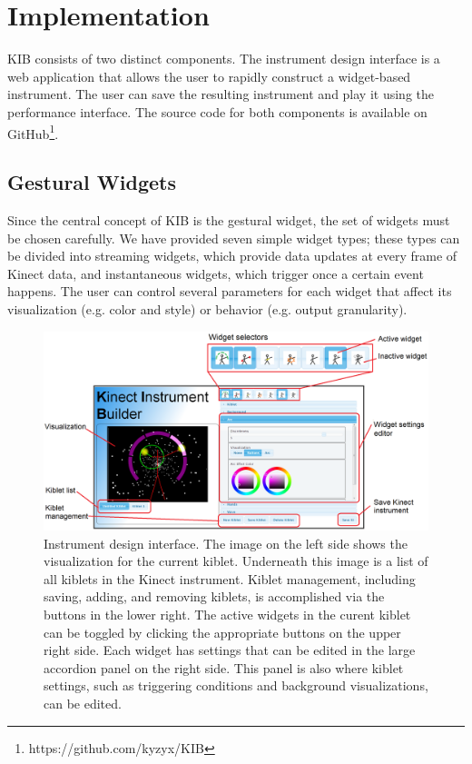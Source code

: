 \documentclass{nime-alternate}
\begin{document}
\section{Implementation}
KIB consists of two distinct components. The instrument design interface is a web
application that allows the user to rapidly construct a widget-based instrument. The user
can save the resulting instrument and play it using the performance interface. The source code
for both components is available on GitHub\footnote{https://github.com/kyzyx/KIB}.
\subsection{Gestural Widgets}
Since the central concept of KIB is the gestural widget, the set of widgets must be chosen
carefully. We have provided seven simple widget types; these types can be divided into streaming
widgets, which provide data updates at every frame of Kinect data, and instantaneous widgets,
which trigger once a certain event happens. The user can control several parameters for each widget
that affect its visualization (e.g. color and style) or behavior (e.g. output granularity).
\begin{figure}
	\centering
		\includegraphics[width=1\textwidth]{figures/kib.png}
	\caption{Instrument design interface. The image on the left side shows the visualization for the current kiblet. Underneath this image is a list of
    all kiblets in the Kinect instrument. Kiblet management, including saving, adding, and removing kiblets, is accomplished via the buttons in the lower right.
    The active widgets in the 
    curent kiblet can be toggled by clicking the appropriate buttons on the upper right side. Each widget has settings that can be edited in the large
    accordion panel on the right side. This panel is also where kiblet settings, such as triggering conditions and background visualizations, can be edited.}
	\label{fig:interface}
\end{figure}
\end{document}
